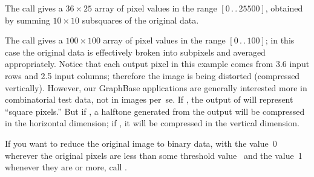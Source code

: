 The call  gives a $36\times25$ array
of pixel values in the range $[0\,.\,.\,25500]$, obtained by summing
$10\times10$ subsquares of the original data.

The call  gives a $100\times100$ array
of pixel values in the range $[0\,.\,.\,100]$; in this case the original
data is effectively broken into subpixels and averaged appropriately.
Notice that each output pixel in this example comes from 3.6 input
rows and 2.5 input columns; therefore the image is being distorted
(compressed vertically). However, our GraphBase applications are generally
interested more in combinatorial test data, not in images per~se.
If , the output of 
will represent ``square
pixels.'' But if , a halftone
generated from the
output will be compressed in the horizontal dimension; if
, it will be compressed in the
vertical dimension.

If you want to reduce the original image to binary data, with the value~0
wherever the original pixels are less than some threshold value~
and the value~1 whenever they are  or more, call
.

